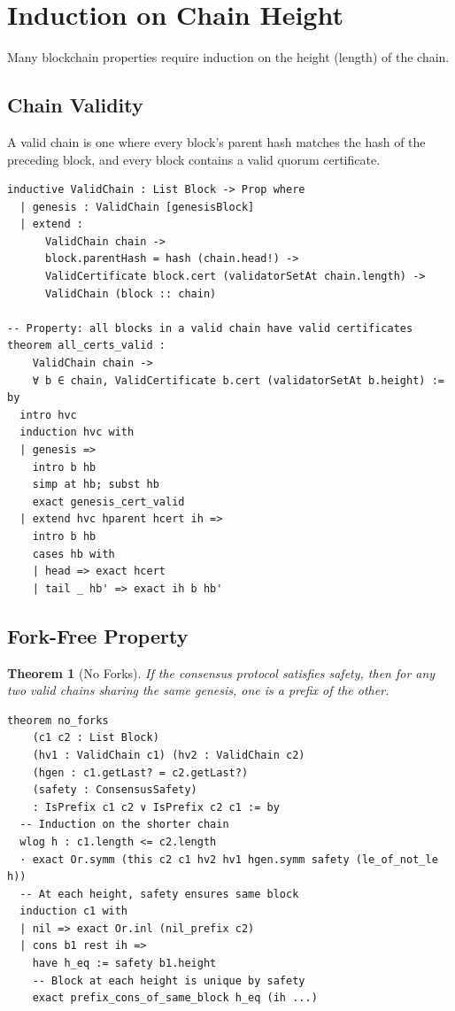 \documentclass[11pt,a4paper]{article}
\newtheorem{theorem}{Theorem}
\begin{document}
\section{Induction on Chain Height}

Many blockchain properties require induction on the height (length) of the chain.

\subsection{Chain Validity}

A valid chain is one where every block's parent hash matches the hash of the preceding
block, and every block contains a valid quorum certificate.

\begin{lstlisting}[language=Lean,caption={Chain validity by induction on height}]
inductive ValidChain : List Block -> Prop where
  | genesis : ValidChain [genesisBlock]
  | extend :
      ValidChain chain ->
      block.parentHash = hash (chain.head!) ->
      ValidCertificate block.cert (validatorSetAt chain.length) ->
      ValidChain (block :: chain)

-- Property: all blocks in a valid chain have valid certificates
theorem all_certs_valid :
    ValidChain chain ->
    ∀ b ∈ chain, ValidCertificate b.cert (validatorSetAt b.height) := by
  intro hvc
  induction hvc with
  | genesis =>
    intro b hb
    simp at hb; subst hb
    exact genesis_cert_valid
  | extend hvc hparent hcert ih =>
    intro b hb
    cases hb with
    | head => exact hcert
    | tail _ hb' => exact ih b hb'
\end{lstlisting}

\subsection{Fork-Free Property}

\begin{theorem}[No Forks]
If the consensus protocol satisfies safety, then for any two valid chains sharing the
same genesis, one is a prefix of the other.
\end{theorem}

\begin{lstlisting}[language=Lean,caption={Fork-freedom from safety}]
theorem no_forks
    (c1 c2 : List Block)
    (hv1 : ValidChain c1) (hv2 : ValidChain c2)
    (hgen : c1.getLast? = c2.getLast?)
    (safety : ConsensusSafety)
    : IsPrefix c1 c2 ∨ IsPrefix c2 c1 := by
  -- Induction on the shorter chain
  wlog h : c1.length <= c2.length
  · exact Or.symm (this c2 c1 hv2 hv1 hgen.symm safety (le_of_not_le h))
  -- At each height, safety ensures same block
  induction c1 with
  | nil => exact Or.inl (nil_prefix c2)
  | cons b1 rest ih =>
    have h_eq := safety b1.height
    -- Block at each height is unique by safety
    exact prefix_cons_of_same_block h_eq (ih ...)
\end{lstlisting}
\end{document}
